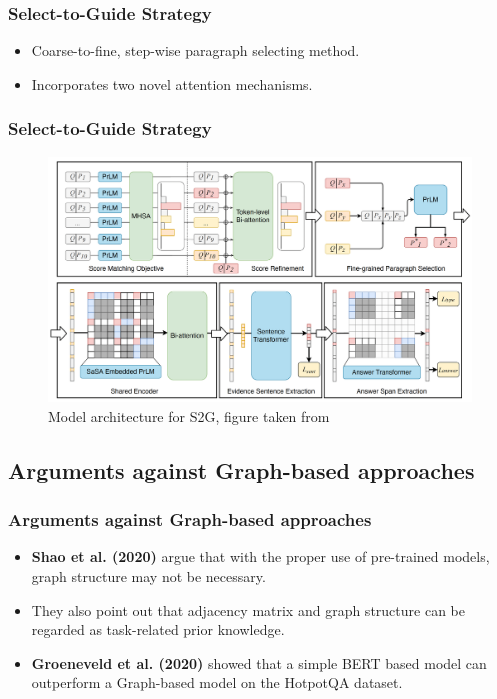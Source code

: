 \documentclass[10pt]{beamer}
\begin{document}
\begin{frame}
  \frametitle{Select-to-Guide Strategy}

  \begin{itemize}
    \item Coarse-to-fine, step-wise paragraph selecting method.
    \item Incorporates two novel attention mechanisms.
  \end{itemize}

\end{frame}

\begin{frame}
  \frametitle{Select-to-Guide Strategy}

  \begin{figure}[t] %
    \centering
    \includegraphics[width=\linewidth]{fig/ext_fig/s2g_diagram.png} %
    \caption{Model architecture for S2G, figure taken from \cite{RN106}}
    \label{fig:sample_hotpotqa} %
  \end{figure}

\end{frame}

\subsection{Arguments against Graph-based approaches}

\begin{frame}
  \frametitle{Arguments against Graph-based approaches}
  \begin{itemize}
    \item \textbf{Shao et al. (2020)} \cite{RN127} argue that with the proper use of pre-trained models, graph structure may not be necessary.
    \item They also point out that adjacency matrix and graph structure can be regarded as task-related prior knowledge.
    \item \textbf{Groeneveld et al. (2020)} \cite{RN126} showed that a simple BERT based model can outperform a Graph-based model on the HotpotQA dataset.
  \end{itemize}

\end{frame}
\end{document}
